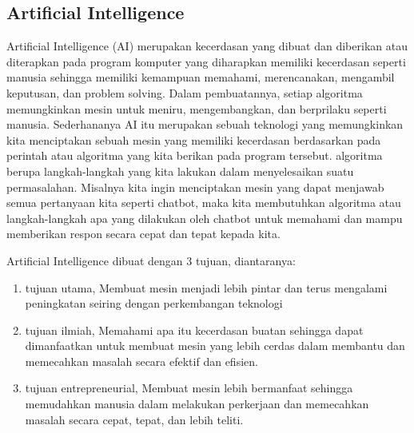 \subsection{Artificial Intelligence}
Artificial Intelligence (AI) merupakan kecerdasan yang dibuat dan diberikan atau diterapkan pada program komputer yang diharapkan memiliki kecerdasan seperti manusia sehingga memiliki kemampuan memahami, merencanakan, mengambil keputusan, dan problem solving. Dalam pembuatannya, setiap algoritma memungkinkan mesin untuk meniru, mengembangkan, dan berprilaku seperti manusia. Sederhananya AI itu merupakan sebuah teknologi yang memungkinkan kita menciptakan sebuah mesin yang memiliki kecerdasan berdasarkan pada perintah atau algoritma yang kita berikan pada program tersebut. algoritma berupa langkah-langkah yang kita lakukan dalam menyelesaikan suatu permasalahan. Misalnya kita ingin menciptakan mesin yang dapat menjawab semua pertanyaan kita seperti chatbot, maka kita membutuhkan algoritma atau langkah-langkah apa yang dilakukan oleh chatbot untuk memahami dan mampu memberikan respon secara cepat dan tepat kepada kita.

Artificial Intelligence dibuat dengan 3 tujuan, diantaranya:
\begin{enumerate}
\item tujuan utama, Membuat mesin menjadi lebih pintar dan terus mengalami peningkatan seiring dengan perkembangan teknologi
\item tujuan ilmiah, Memahami apa itu kecerdasan buatan sehingga dapat dimanfaatkan untuk membuat mesin yang lebih cerdas dalam membantu dan memecahkan masalah secara efektif dan efisien.
\item tujuan entrepreneurial, Membuat mesin lebih bermanfaat sehingga memudahkan manusia dalam melakukan perkerjaan dan memecahkan masalah secara cepat, tepat, dan lebih teliti.
\end{enumerate}

